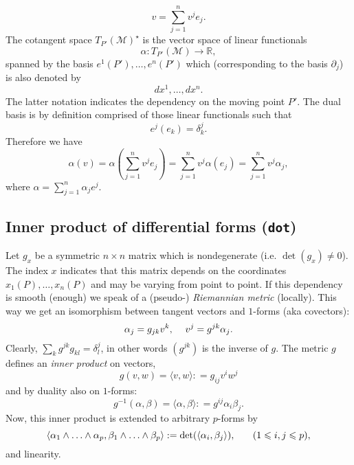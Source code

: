 \documentclass[12pt,a4paper]{article}
\begin{document}
\begin{displaymath}
  v = \sum_{j = 1}^n v^j e_j . 
\end{displaymath}
The cotangent space $T_{P'}^{} (\mathcal{M})^{\star}$ is the vector space
of linear functionals 
\begin{displaymath}
   \alpha : T_{P'} (\mathcal{M}) \rightarrow \mathbb{R},
\end{displaymath}
spanned by the basis $e^1 (P'), \ldots, e^n (P')$
which (corresponding to the basis $\partial_j$) is also denoted by 
\begin{displaymath}
	d x^1,\ldots, d x^n. 
\end{displaymath}
The latter notation indicates the dependency on the moving
point $P'$. The dual basis is by definition comprised of those linear
functionals such that
\begin{displaymath}
  e^j (e_k) = \delta^j_k . 
\end{displaymath}
Therefore we have 
\begin{displaymath}
	\alpha (v) = \alpha \left( \sum_{j = 1}^n v^j e_j \right) =
   \sum_{j = 1}^n v^j \alpha (e_j) = \sum_{j = 1}^n v^j \alpha_j,
\end{displaymath}
where $\alpha = \sum_{j = 1}^n \alpha_j e^j$.   

\subsection{Inner product of differential forms ({\tt dot})}
Let $g_x$ be a symmetric $n \times n$ matrix which is 
nondegenerate (i.e. $\det (g_x) \neq 0$). The index $x$ indicates that 
this matrix depends on the coordinates $x_1 (P), \ldots, x_n (P)$ and 
may be varying from point to point. If this dependency is smooth (enough) 
we speak of a (pseudo-) {\it Riemannian metric} (locally). This way we 
get an isomorphism between tangent vectors and $1$-forms (aka covectors):
\begin{displaymath}
	\alpha_j = g_{j k} v^k, \hspace{1.2em} v^j = g^{j k} \alpha_j .
\end{displaymath}
Clearly, $\sum_k g^{j k} g_{k l} = \delta^j_l$, in other words 
$(g^{j k})$ is the inverse of $g$. The metric $g$ defines an 
{\it inner product} on vectors,
\begin{displaymath}
	g (v, w) = \langle v, w \rangle : = g_{i j} v^i w^j 
\end{displaymath}
and by duality also on $1$-forms:
\begin{displaymath}
	 g^{- 1} (\alpha, \beta) = \langle \alpha, \beta \rangle : = g^{i j}
   \alpha_i \beta_j . 	
\end{displaymath}
Now, this inner product is extended to arbitrary $p$-forms by
\begin{displaymath}
	  \langle \alpha_1 \wedge \ldots \wedge \alpha_p , \beta_1 \wedge
  \ldots \wedge \beta_p \rangle : = \det (\langle \alpha_i, \beta_j \rangle)
  , \hspace{1.8em} (1 \leqslant i, j \leqslant p), \label{dot}
\end{displaymath}
and linearity.
%
\end{document}

